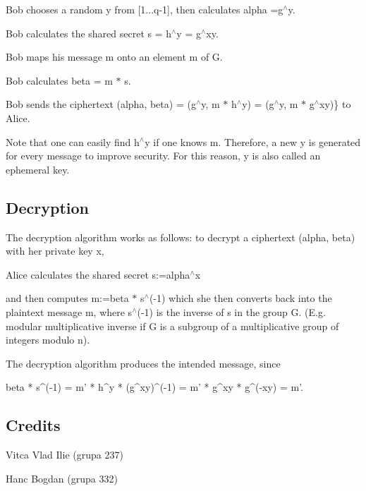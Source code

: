 \begin{DoxyItemize}
\item Bob chooses a random y from \mbox{[}1...q-\/1\mbox{]}, then calculates alpha =g$^\wedge$y.
\item Bob calculates the shared secret s = h$^\wedge$y = g$^\wedge$xy.
\item Bob maps his message m onto an element m\textquotesingle{} of G.
\item Bob calculates beta = m\textquotesingle{} $\ast$ s.
\item Bob sends the ciphertext (alpha, beta) = (g$^\wedge$y, m\textquotesingle{} $\ast$ h$^\wedge$y) = (g$^\wedge$y, m\textquotesingle{} $\ast$ g$^\wedge$xy)\} to Alice.
\end{DoxyItemize}

Note that one can easily find h$^\wedge$y if one knows m\textquotesingle{}. Therefore, a new y is generated for every message to improve security. For this reason, y is also called an ephemeral key.\hypertarget{index_decryption}{}\subsection{Decryption}\label{index_decryption}
The decryption algorithm works as follows\+: to decrypt a ciphertext (alpha, beta) with her private key x,


\begin{DoxyItemize}
\item Alice calculates the shared secret s\+:=alpha$^\wedge$x
\item and then computes m\textquotesingle{}\+:=beta $\ast$ s$^\wedge$(-\/1) which she then converts back into the plaintext message m, where s$^\wedge$(-\/1) is the inverse of s in the group G. (E.\+g. modular multiplicative inverse if G is a subgroup of a multiplicative group of integers modulo n).
\end{DoxyItemize}

The decryption algorithm produces the intended message, since \begin{DoxyVerb}beta * s^(-1) = m' * h^y * (g^xy)^(-1) = m' * g^xy * g^(-xy) = m'.
\end{DoxyVerb}
\hypertarget{index_credits}{}\subsection{Credits}\label{index_credits}

\begin{DoxyItemize}
\item Vitca Vlad Ilie (grupa 237)
\item Hanc Bogdan (grupa 332) 
\end{DoxyItemize}